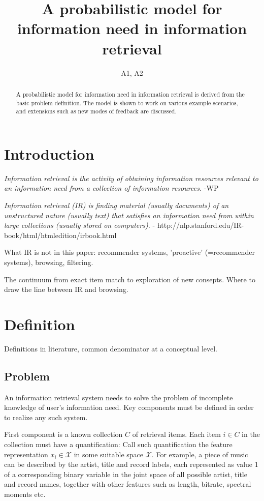 \documentclass[10pt]{article}
\title{A probabilistic model for information need in information retrieval}
\author{A1, A2}
\date{}
\begin{document}
\maketitle
\begin{abstract}
 A probabilistic model for information need in information retrieval is derived from the basic problem definition. The model is shown to work on various example scenarios, and extensions such as new modes of feedback are discussed.
\end{abstract}

\section{Introduction}
{\it Information retrieval is the activity of obtaining information resources relevant to an information need from a collection of information resources.} -WP

{\it Information retrieval (IR) is finding material (usually documents) of an unstructured nature (usually text) that satisfies an information need from within large collections (usually stored on computers).} - http://nlp.stanford.edu/IR-book/html/htmledition/irbook.html

What IR is not in this paper: recommender systems, 'proactive' (=recommender systems), browsing, filtering.

The continuum from exact item match to exploration of new consepts. Where to draw the line between IR and browsing.



\section{Definition}

Definitions in literature, common denominator at a conceptual level.

\subsection{Problem}
An information retrieval system needs to solve the problem of incomplete knowledge of user's information need. Key components must be defined in order to realize any such system.

First component is a known collection $C$ of retrieval items. Each item $i \in C$ in the collection must have a quantification: Call such quantification the feature representation $x_i\in \mathcal X$ in some suitable space $\mathcal X$. For example, a piece of music can be described by the artist, title and record labels, each represented as value 1 of a corresponding binary variable in the joint space of all possible artist, title and record names, together with other features such as length, bitrate, spectral moments etc.
\end{document}
